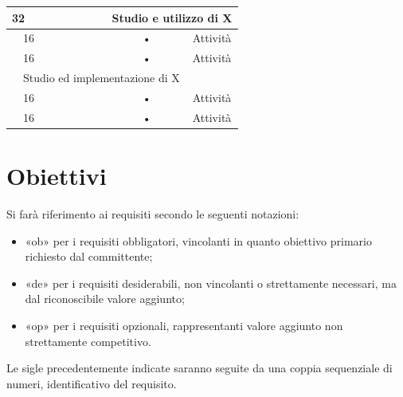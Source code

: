 \documentclass[11pt,notitlepage]{article}
\begin{document}
\begin{center}
\begin{tabular}{|l|l|c l|}
	\multicolumn{2}{|l|}{32}	&	\multicolumn{2}{l|}{Studio e utilizzo di X}\\
	\hline	
	
	\multirow{5}{1cm}{ }    &            16            &            \hspace{5mm}•\hspace{2mm}            &            Attività\\
	\cline{2-2}
	&            16            &         \hspace{5mm}•\hspace{2mm}           &            Attività\\
	\hline

	\multicolumn{2}{|l|}{32}	&	\multicolumn{2}{l|}{Studio ed implementazione di X}\\
	\hline
	
	\multirow{5}{1cm}{ }    &            16            &            \hspace{5mm}•\hspace{2mm}            &            Attività\\
	\cline{2-2}
	&            16            &         \hspace{5mm}•\hspace{2mm}           &            Attività\\
	\hline	
\end{tabular}

\end{center}

\section*{Obiettivi}

Si farà riferimento ai requisiti secondo le seguenti notazioni:
\begin{itemize}
	\item «ob» per i requisiti obbligatori, vincolanti in quanto obiettivo primario
	richiesto dal committente;
	\item  «de» per i requisiti desiderabili, non vincolanti o strettamente necessari,
	ma dal riconoscibile valore aggiunto;
	\item «op» per i requisiti opzionali, rappresentanti valore aggiunto non
	strettamente competitivo.
\end{itemize}
Le sigle precedentemente indicate saranno seguite da una coppia sequenziale di numeri, identificativo del requisito.\\

\newpage
\end{document}
